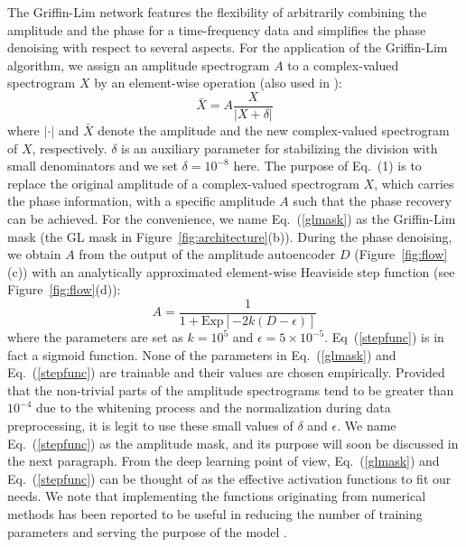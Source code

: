 \documentclass[preprint,12pt]{elsarticle}
\begin{document}
The Griffin-Lim network features the flexibility of arbitrarily combining the amplitude and the phase for a time-frequency data and simplifies the phase denoising with respect to several aspects. 
For the application of the Griffin-Lim algorithm, we assign an amplitude spectrogram $A$ to a complex-valued spectrogram $X$ by an element-wise operation (also used in \cite{liu2021novel}):
\begin{equation}\label{glmask}
    \bar{X}=A\frac{X}{|X+\delta|}
\end{equation}
where $|\cdot|$ and $\bar{X}$ denote the amplitude and the new complex-valued spectrogram of $X$, respectively.
$\delta$ is an auxiliary parameter for stabilizing the division with small denominators and we set $\delta=10^{-8}$ here.
The purpose of Eq.~(1) is to replace the original amplitude of a complex-valued spectrogram $X$, which carries the phase information, with a specific amplitude $A$ such that the phase recovery can be achieved.
For the convenience, we name Eq.~(\ref{glmask}) as the Griffin-Lim mask (the GL mask in Figure~\ref{fig:architecture}(b)).
During the phase denoising, we obtain $A$ from the output of the amplitude autoencoder $D$ (Figure~\ref{fig:flow}(c)) with an analytically approximated element-wise Heaviside step function (see Figure~\ref{fig:flow}(d)):
\begin{equation}\label{stepfunc}
    A=\frac{1}{1+\mathrm{Exp}\left[-2k\left(D-\epsilon\right)\right]}
\end{equation}
where the parameters are set as $k=10^{5}$ and $\epsilon=5\times10^{-5}$. 
Eq~(\ref{stepfunc}) is in fact a sigmoid function.
None of the parameters in Eq.~(\ref{glmask}) and Eq.~(\ref{stepfunc}) are trainable and their values are chosen empirically. 
Provided that the non-trivial parts of the amplitude spectrograms tend to be greater than $10^{-4}$ due to the whitening process and the normalization during data preprocessing, it is legit to use these small values of $\delta$ and $\epsilon$.
We name Eq.~(\ref{stepfunc}) as the amplitude mask, and its purpose will soon be discussed in the next paragraph.
From the deep learning point of view, Eq.~(\ref{glmask}) and Eq.~(\ref{stepfunc}) can be thought of as the effective activation functions to fit our needs. 
We note that implementing the functions originating from numerical methods has been reported to be useful in reducing the number of training parameters and serving the purpose of the model \cite{masuyama2020deep}.
\end{document}
